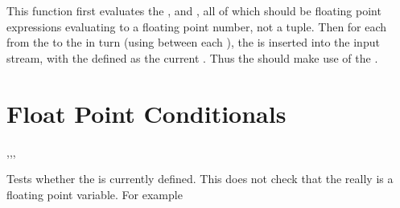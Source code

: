 \documentclass[oneside]{book}
\begin{document}
\begin{function}{\FpStepVariable}
\begin{syntax}
     
\end{syntax}
This function first evaluates the , 
and , all of which should be floating point
expressions evaluating to a floating point number, not a tuple.
Then for each  from the  to the
 in turn (using  between each
), the  is inserted into the input stream,
with the  defined as the current .  Thus
the  should make use of the .
\end{function}

\section{Float Point Conditionals}

\begin{function}{\FpIfExist,\FpIfExistT,\FpIfExistF,\FpIfExistTF}
\begin{syntax}
 
  
  
   
\end{syntax}
Tests whether the  is currently defined.  This does not
check that the  really is a floating point variable.
For example
\begin{demohigh}
\FpIfExistTF {} {}
\FpIfExistTF {} {}
\end{demohigh}
\end{function}
\end{document}
